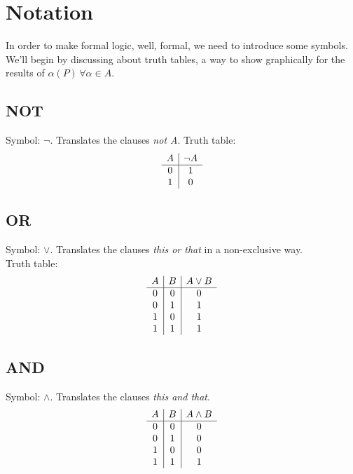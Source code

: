 \documentclass{report}
\begin{document}
    \section{Notation}
        In order to make formal logic, well, formal, we need to introduce some symbols. \\
        We'll begin by discussing about truth tables, a way to show graphically for 
        the results of $\alpha\left(P\right) \, \forall \alpha \in A$.
        \subsection{NOT}
            Symbol: $\neg$. Translates the clauses \textit{not A}. 
            Truth table:
            $$\begin{array}{c | c}
                A & \neg A \\
                \hline
                0 & 1 \\
                1 & 0
            \end{array}$$
        \subsection{OR}
            Symbol: $\lor$. Translates the clauses \textit{this or that} in a non-exclusive 
            way. \\
            Truth table:
            $$\begin{array}{c | c | c}
                A & B & A \lor B \\
                \hline
                0 & 0 & 0 \\
                0 & 1 & 1 \\
                1 & 0 & 1 \\
                1 & 1 & 1 \\
            \end{array}$$
        \subsection{AND}
            Symbol: $\land$. Translates the clauses \textit{this and that}.
            $$\begin{array}{c | c | c}
                A & B & A \land B \\
                \hline
                0 & 0 & 0 \\
                0 & 1 & 0 \\
                1 & 0 & 0 \\
                1 & 1 & 1 \\
            \end{array}$$
\end{document}
